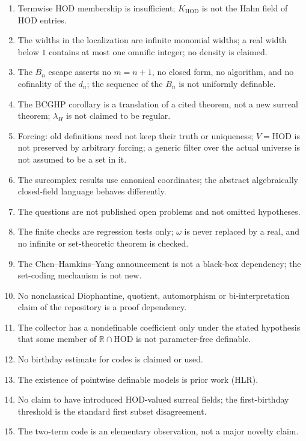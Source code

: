 \documentclass[11pt,a4paper]{article}
\numberwithin{equation}{section}
\theoremstyle{definition}
\theoremstyle{remark}
\newcommand{\HOD}{\mathrm{HOD}}
\newcommand{\R}{\mathbb R}
\newcommand{\KH}{K_{\HOD}}
\begin{document}
\begin{enumerate}[label=N4.\arabic*]
\item Termwise $\HOD$ membership is insufficient; $\KH$ is not the Hahn field
of $\HOD$ entries.
\item The widths in the localization are infinite monomial widths; a real
width below $1$ contains at most one omnific integer; no density is
claimed.
\item The $B_n$ escape asserts no $m=n+1$, no closed form, no algorithm, and
no cofinality of the $d_n$; the sequence of the $B_n$ is not uniformly
definable.
\item The BCGHP corollary is a translation of a cited theorem, not a new
surreal theorem; $\lambda_H$ is not claimed to be regular.
\item Forcing: old definitions need not keep their truth or uniqueness;
$V=\HOD$ is not preserved by arbitrary forcing; a generic filter over the
actual universe is not assumed to be a set in it.
\item The surcomplex results use canonical coordinates; the abstract
algebraically closed-field language behaves differently.
\item The questions are not published open problems and not omitted
hypotheses.
\item The finite checks are regression tests only; $\omega$ is never
replaced by a real, and no infinite or set-theoretic theorem is checked.
\item The Chen--Hamkins--Yang announcement is not a black-box dependency; the
set-coding mechanism is not new.
\item No nonclassical Diophantine, quotient, automorphism or
bi-interpretation claim of the repository is a proof dependency.
\item The collector has a nondefinable coefficient only under the stated
hypothesis that some member of $\R\cap\HOD$ is not parameter-free
definable.
\item No birthday estimate for codes is claimed or used.
\item The existence of pointwise definable models is prior work (HLR).
\item No claim to have introduced $\HOD$-valued surreal fields; the
first-birthday threshold is the standard first subset disagreement.
\item The two-term code is an elementary observation, not a major novelty
claim.
\end{enumerate}
\end{document}
